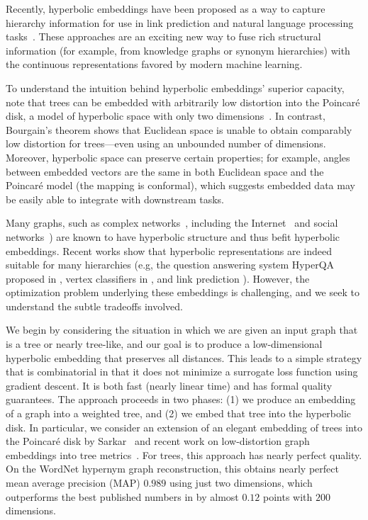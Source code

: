 Recently, hyperbolic embeddings have been proposed as a way to capture
hierarchy information for use in link prediction and natural language
processing tasks~\cite{fb, ucl}. These approaches are an exciting new
way to fuse rich structural information (for example, from knowledge graphs or
synonym hierarchies) with the continuous representations favored by
modern machine learning.


To understand the intuition behind hyperbolic embeddings' superior
capacity, note that trees can be embedded with arbitrarily low
distortion into the Poincar\'e disk, a model of hyperbolic space
with only two dimensions~\cite{sarkar}. In contrast, Bourgain's
theorem \cite{Lineal} shows that Euclidean space is unable to obtain
comparably low distortion for trees---even using an unbounded number of
dimensions.
Moreover, hyperbolic space can preserve certain properties;
for example, angles between embedded vectors are the same in
both Euclidean space and the Poincar\'e model (the mapping is conformal),
which suggests embedded data may be easily able to integrate with downstream
tasks. 

Many graphs, such as complex networks~\cite{krioukov2010hyperbolic}, including the Internet~\cite{krioukov2009curvature} and social networks~\cite{verbeek2016metric}) are known to have hyperbolic structure and thus befit hyperbolic embeddings. Recent works show that hyperbolic representations are indeed suitable for many hierarchies (e.g, the question answering system HyperQA proposed in \cite{tay2018hyperbolic}, vertex classifiers in \cite{ucl}, and link prediction \cite{fb}). However, the optimization problem underlying these embeddings is
challenging, and we seek to understand the subtle tradeoffs involved.

We begin by considering the situation in which we are given an input
graph that is a tree or nearly tree-like, and our goal is to produce
a low-dimensional hyperbolic embedding that preserves all distances. This
leads to a simple strategy that is combinatorial in that it does not
minimize a surrogate loss function using gradient descent. It is both
fast (nearly linear time) and has formal quality guarantees. The
approach proceeds in two phases: (1) we produce an embedding of a
graph into a weighted tree, and (2) we embed that tree into the
hyperbolic disk. In particular, we consider an extension of an elegant embedding of trees
into the Poincar\'e disk by Sarkar~\cite{sarkar} and recent work on
low-distortion graph embeddings into tree metrics~\cite{Abraham}. For trees, this approach has nearly perfect
quality. On the WordNet hypernym graph reconstruction, this obtains
nearly perfect mean average precision (MAP) $0.989$ using just two
dimensions, which outperforms the best published numbers in \citet{fb}
by almost $0.12$ points with $200$ dimensions.

